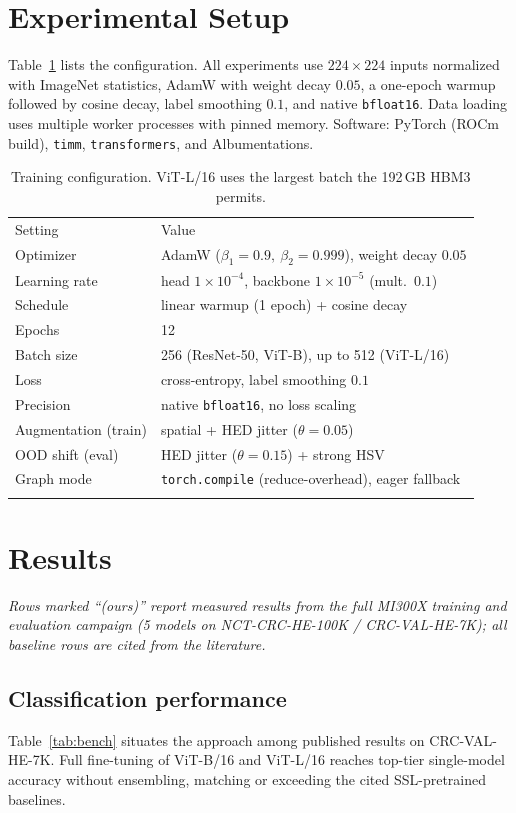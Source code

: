 \documentclass[11pt]{article}
\newcommand{\toprule}{\hline\noalign{\smallskip}}
\newcommand{\midrule}{\noalign{\smallskip}\hline\noalign{\smallskip}}
\newcommand{\bottomrule}{\noalign{\smallskip}\hline}
\begin{document}
\section{Experimental Setup}
Table~\ref{tab:hparams} lists the configuration. All experiments use $224\times224$ inputs
normalized with ImageNet statistics, AdamW with weight decay $0.05$, a one-epoch warmup followed by
cosine decay, label smoothing $0.1$, and native \texttt{bfloat16}. Data loading uses multiple
worker processes with pinned memory. Software: PyTorch (ROCm build), \texttt{timm},
\texttt{transformers}, and Albumentations.

\begin{table}[h]
\centering
\caption{Training configuration. ViT-L/16 uses the largest batch the 192\,GB HBM3 permits.}
\label{tab:hparams}
\begin{tabular}{ll}
\toprule
Setting & Value \\
\midrule
Optimizer & AdamW ($\beta_1{=}0.9,\ \beta_2{=}0.999$), weight decay $0.05$ \\
Learning rate & head $1\times10^{-4}$, backbone $1\times10^{-5}$ (mult.\ $0.1$) \\
Schedule & linear warmup (1 epoch) + cosine decay \\
Epochs & 12 \\
Batch size & 256 (ResNet-50, ViT-B), up to 512 (ViT-L/16) \\
Loss & cross-entropy, label smoothing $0.1$ \\
Precision & native \texttt{bfloat16}, no loss scaling \\
Augmentation (train) & spatial + HED jitter ($\theta{=}0.05$) \\
OOD shift (eval) & HED jitter ($\theta{=}0.15$) + strong HSV \\
Graph mode & \texttt{torch.compile} (reduce-overhead), eager fallback \\
\bottomrule
\end{tabular}
\end{table}

\section{Results}
\textit{\small Rows marked ``(ours)'' report measured results from the full MI300X training and
evaluation campaign (5 models on NCT-CRC-HE-100K / CRC-VAL-HE-7K); all baseline rows are cited
from the literature.}

\subsection{Classification performance}
Table~\ref{tab:bench} situates the approach among published results on CRC-VAL-HE-7K. Full
fine-tuning of ViT-B/16 and ViT-L/16 reaches top-tier single-model accuracy without ensembling,
matching or exceeding the cited SSL-pretrained baselines.
\end{document}
